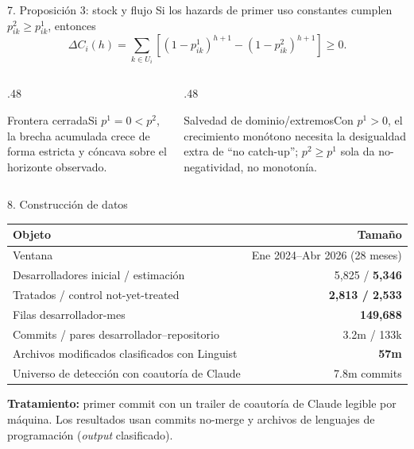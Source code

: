 \documentclass[aspectratio=169,10pt]{beamer}
\begin{document}
\begin{frame}{7. Proposición 3: stock y flujo}
Si los hazards de primer uso constantes cumplen $p^2_{ik}\ge p^1_{ik}$, entonces
\[
\Delta C_i(h)=\sum_{k\in U_i}\left[(1-p^1_{ik})^{h+1}-(1-p^2_{ik})^{h+1}\right]\ge0.
\]
\begin{columns}[T,onlytextwidth]
\begin{column}{.48\textwidth}\begin{block}{Frontera cerrada}Si $p^1=0<p^2$, la brecha acumulada crece de forma estricta y cóncava sobre el horizonte observado.\end{block}\end{column}
\begin{column}{.48\textwidth}\begin{alertblock}{Salvedad de dominio/extremos}Con $p^1>0$, el crecimiento monótono necesita la desigualdad extra de ``no catch-up''; $p^2\ge p^1$ sola da no-negatividad, no monotonía.\end{alertblock}\end{column}
\end{columns}
\end{frame}

\begin{frame}{8. Construcción de datos}
\begin{center}\small
\begin{tabular}{lr}
\toprule Objeto & Tamaño \\
\midrule
Ventana & Ene 2024--Abr 2026 (28 meses) \\
Desarrolladores inicial / estimación & 5,825 / \textbf{5,346} \\
Tratados / control not-yet-treated & \textbf{2,813 / 2,533} \\
Filas desarrollador-mes & \textbf{149,688} \\
Commits / pares desarrollador--repositorio & 3.2m / 133k \\
Archivos modificados clasificados con Linguist & \textbf{57m} \\
Universo de detección con coautoría de Claude & 7.8m commits \\
\bottomrule
\end{tabular}
\end{center}
\vspace{.3em}
\textbf{Tratamiento:} primer commit con un trailer de coautoría de Claude legible por máquina. Los resultados usan commits no-merge y archivos de lenguajes de programación (\emph{output} clasificado).
\end{frame}
\end{document}
